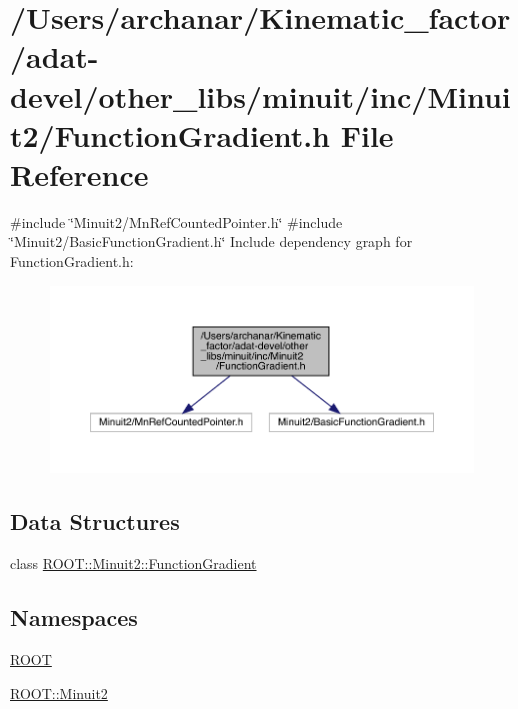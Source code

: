 \hypertarget{adat-devel_2other__libs_2minuit_2inc_2Minuit2_2FunctionGradient_8h}{}\section{/\+Users/archanar/\+Kinematic\+\_\+factor/adat-\/devel/other\+\_\+libs/minuit/inc/\+Minuit2/\+Function\+Gradient.h File Reference}
\label{adat-devel_2other__libs_2minuit_2inc_2Minuit2_2FunctionGradient_8h}
{\ttfamily \#include \char`\"{}Minuit2/\+Mn\+Ref\+Counted\+Pointer.\+h\char`\"{}}\newline
{\ttfamily \#include \char`\"{}Minuit2/\+Basic\+Function\+Gradient.\+h\char`\"{}}\newline
Include dependency graph for Function\+Gradient.\+h\+:
\nopagebreak
\begin{figure}[H]
\begin{center}
\leavevmode
\includegraphics[width=350pt]{d0/d2b/adat-devel_2other__libs_2minuit_2inc_2Minuit2_2FunctionGradient_8h__incl}
\end{center}
\end{figure}
\subsection*{Data Structures}
\begin{DoxyCompactItemize}
\item 
class \mbox{\hyperlink{classROOT_1_1Minuit2_1_1FunctionGradient}{R\+O\+O\+T\+::\+Minuit2\+::\+Function\+Gradient}}
\end{DoxyCompactItemize}
\subsection*{Namespaces}
\begin{DoxyCompactItemize}
\item 
 \mbox{\hyperlink{namespaceROOT}{R\+O\+OT}}
\item 
 \mbox{\hyperlink{namespaceROOT_1_1Minuit2}{R\+O\+O\+T\+::\+Minuit2}}
\end{DoxyCompactItemize}
